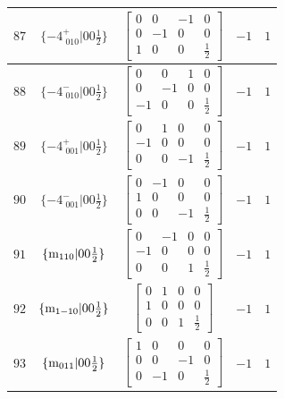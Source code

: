 \documentclass[fleqn,8pt]{jsarticle}
\begin{document}
\begin{longtable}{ccccc}
$ 87 $ & $ \{-4^{+}_{\,\,010}|0 0 \frac{1}{2}\} $ & $ \begin{bmatrix} 0 & 0 & -1 & 0 \\ 0 & -1 & 0 & 0 \\ 1 & 0 & 0 & \frac{1}{2} \end{bmatrix} $ & $ -1 $ & $ 1 $ \\ \hline
$ 88 $ & $ \{-4^{-}_{\,\,010}|0 0 \frac{1}{2}\} $ & $ \begin{bmatrix} 0 & 0 & 1 & 0 \\ 0 & -1 & 0 & 0 \\ -1 & 0 & 0 & \frac{1}{2} \end{bmatrix} $ & $ -1 $ & $ 1 $ \\ \hline
$ 89 $ & $ \{-4^{+}_{\,\,001}|0 0 \frac{1}{2}\} $ & $ \begin{bmatrix} 0 & 1 & 0 & 0 \\ -1 & 0 & 0 & 0 \\ 0 & 0 & -1 & \frac{1}{2} \end{bmatrix} $ & $ -1 $ & $ 1 $ \\ \hline
$ 90 $ & $ \{-4^{-}_{\,\,001}|0 0 \frac{1}{2}\} $ & $ \begin{bmatrix} 0 & -1 & 0 & 0 \\ 1 & 0 & 0 & 0 \\ 0 & 0 & -1 & \frac{1}{2} \end{bmatrix} $ & $ -1 $ & $ 1 $ \\ \hline
$ 91 $ & $ \{{\rm m}_{110}|0 0 \frac{1}{2}\} $ & $ \begin{bmatrix} 0 & -1 & 0 & 0 \\ -1 & 0 & 0 & 0 \\ 0 & 0 & 1 & \frac{1}{2} \end{bmatrix} $ & $ -1 $ & $ 1 $ \\ \hline
$ 92 $ & $ \{{\rm m}_{1-10}|0 0 \frac{1}{2}\} $ & $ \begin{bmatrix} 0 & 1 & 0 & 0 \\ 1 & 0 & 0 & 0 \\ 0 & 0 & 1 & \frac{1}{2} \end{bmatrix} $ & $ -1 $ & $ 1 $ \\ \hline
$ 93 $ & $ \{{\rm m}_{011}|0 0 \frac{1}{2}\} $ & $ \begin{bmatrix} 1 & 0 & 0 & 0 \\ 0 & 0 & -1 & 0 \\ 0 & -1 & 0 & \frac{1}{2} \end{bmatrix} $ & $ -1 $ & $ 1 $ \\ \hline

\end{longtable}
\end{document}
